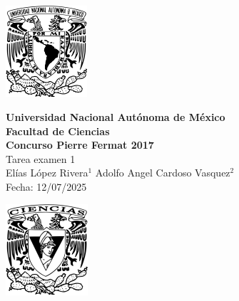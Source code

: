 \documentclass[11pt,letterpaper]{article}
\begin{document}
\makeatletter
        \renewenvironment{proof}[1][\proofname]{\par
            \pushQED{\qed}%
            \normalfont \topsep6\p@\@plus6\p@\relax
            \trivlist
            \item\relax
            {\itshape
            #1\@addpunct{.}}\par\vspace{\baselineskip}\ignorespaces
            }{%
            \popQED\endtrivlist\@endpefalse
            }
\makeatother

\begin{center}
    \begin{minipage}{3cm}
    	\begin{center}
    		\includegraphics[height=3.4cm]{logo_unam.png}
    	\end{center}
    \end{minipage}\hfill
    \begin{minipage}{10cm}
    	\begin{center}
    	\textbf{\large Universidad Nacional Autónoma de México}\\[0.1cm]
        \textbf{Facultad de Ciencias}\\[0.1cm]
        \textbf{Concurso Pierre Fermat 2017}\\[0.1cm]
        Tarea examen 1 \\[0.1cm]
         El\'ias L\'opez Rivera$^{1}$\,\,Adolfo Angel Cardoso Vasquez$^{2}$\\[0.1cm]
        Fecha:\,\,12/07/2025
    	\end{center}
    \end{minipage}\hfill
    \begin{minipage}{3cm}
    	\begin{center}
    		\includegraphics[height=3.4cm]{Logo_FC.png}
    	\end{center}
    \end{minipage}
\end{center}
\end{document}
